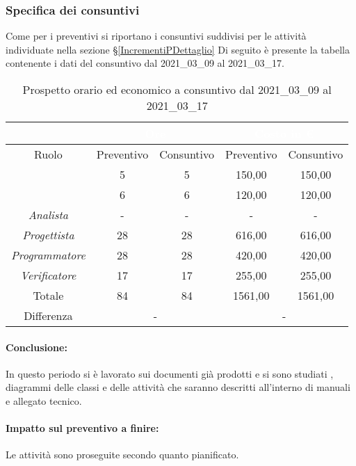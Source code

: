 \subsubsection{Specifica dei consuntivi}
Come per i preventivi si riportano i consuntivi suddivisi per le attività individuate nella sezione \S\ref{IncrementiPDettaglio}
Di seguito è presente la tabella contenente i dati del consuntivo dal 2021\_03\_09 al 2021\_03\_17.
\begin{table}[H]
	\centering
	\begin{tabular}{|c|c|c|c|c|}
		\rowcolor{darkblue} 
		&\multicolumn{2}{c|}{\textcolor{white}{Ore}}&\multicolumn{2}{c|}{\textcolor{white}{Costo in €}}\\ \hline
		Ruolo				&	Preventivo			&	Consuntivo		&	Preventivo	&	Consuntivo\\ \hline
		{\Responsabile}		&	5					&	5				&	150,00		&	150,00 \\ \hline
		{\Amministratore}	&	6					&	6				&	120,00		&	120,00 \\ \hline
		\textit{Analista}	&	-					&	-				&	-			&	- \\ \hline
		\textit{Progettista}& 	28					&   28 				& 	616,00		&  	616,00 \\ \hline
		\textit{Programmatore}& 28					& 	28				& 	420,00		&  	420,00 \\ \hline
		\textit{Verificatore}&	17					&	17				&	255,00		&	255,00\\ \hline
		Totale				&	84					&	84				&	1561,00		&	1561,00 \\ \hline
		Differenza			& 	\multicolumn{2}{c|}{-} 			    &\multicolumn{2}{c|}{-}\\ \hline
	\end{tabular}
	\caption{Prospetto orario ed economico a consuntivo dal 2021\_03\_09 al 2021\_03\_17}
\end{table}
\paragraph*{Conclusione:}
In questo periodo si è lavorato sui documenti già prodotti e si sono studiati , diagrammi delle classi e delle attività che saranno descritti all'interno di manuali e allegato tecnico.
\paragraph*{Impatto sul preventivo a finire:}
Le attività sono proseguite secondo quanto pianificato.

